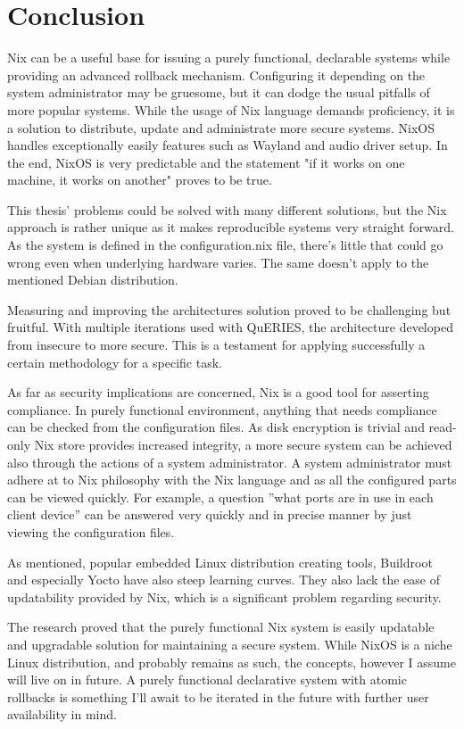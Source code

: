 \chapter{Conclusion} \label{conclusion}

Nix can be a useful base for issuing a purely functional, declarable
systems while providing an advanced rollback mechanism. Configuring it
depending on the system administrator may be gruesome, but it can
dodge the usual pitfalls of more popular systems. While the usage of
Nix language demands proficiency, it is a solution to distribute,
update and administrate more secure systems. NixOS handles
exceptionally easily features such as Wayland and audio driver
setup. In the end, NixOS is very predictable and the statement "if it
works on one machine, it works on another" proves to be true.

This thesis' problems could be solved with many different solutions,
but the Nix approach is rather unique as it makes reproducible systems
very straight forward. As the system is defined in the
configuration.nix file, there's little that could go wrong even when
underlying hardware varies. The same doesn't apply to the mentioned
Debian distribution.

Measuring and improving the architectures solution proved to be
challenging but fruitful. With multiple iterations used with QuERIES,
the architecture developed from insecure to more secure. This is a
testament for applying successfully a certain methodology for a
specific task.

As far as security implications are concerned, Nix is a good tool for
asserting compliance. In purely functional environment, anything that
needs compliance can be checked from the configuration files. As disk
encryption is trivial and read-only Nix store provides increased
integrity, a more secure system can be achieved also through the
actions of a system administrator. A system administrator must adhere
at to Nix philosophy with the Nix language and as all the configured
parts can be viewed quickly. For example, a question ''what ports are
in use in each client device'' can be answered very quickly and in
precise manner by just viewing the configuration files.

As mentioned, popular embedded Linux distribution creating tools,
Buildroot and especially Yocto have also steep learning curves. They
also lack the ease of updatability provided by Nix, which is a
significant problem regarding security.

The research proved that the purely functional Nix system is easily
updatable and upgradable solution for maintaining a secure system.
While NixOS is a niche Linux distribution, and probably remains as
such, the concepts, however I assume will live on in future. A purely
functional declarative system with atomic rollbacks is something I'll
await to be iterated in the future with further user availability in
mind.
